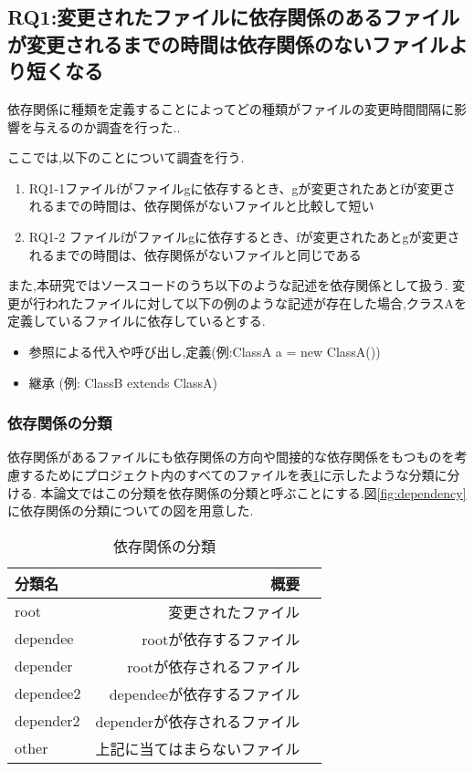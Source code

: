 \documentclass[submit,ses,noauthor]{ipsj} %
\begin{document}
\subsection{RQ1:変更されたファイルに依存関係のあるファイルが変更されるまでの時間は依存関係のないファイルより短くなる}
依存関係に種類を定義することによってどの種類がファイルの変更時間間隔に影響を与えるのか調査を行った..

ここでは,以下のことについて調査を行う.
\begin{enumerate}
\item RQ1-1ファイルfがファイルgに依存するとき、gが変更されたあとfが変更されるまでの時間は、依存関係がないファイルと比較して短い
\item RQ1-2 ファイルfがファイルgに依存するとき、fが変更されたあとgが変更されるまでの時間は、依存関係がないファイルと同じである
\end{enumerate}

また,本研究ではソースコードのうち以下のような記述を依存関係として扱う.
変更が行われたファイルに対して以下の例のような記述が存在した場合,クラスAを定義しているファイルに依存しているとする.

\begin{itemize}
\item 参照による代入や呼び出し,定義(例:ClassA a = new ClassA())
\item 継承 (例: ClassB extends ClassA)
\end{itemize}

\subsubsection{依存関係の分類}
依存関係があるファイルにも依存関係の方向や間接的な依存関係をもつものを考慮するためにプロジェクト内のすべてのファイルを表\ref{tab:依存関係の分類}に示したような分類に分ける.
本論文ではこの分類を依存関係の分類と呼ぶことにする.図\ref{fig:dependency}に依存関係の分類についての図を用意した.

\begin{table}
\caption{依存関係の分類}
\begin{tabular}{|l|r|r|} \hline
分類名 & 概要 \\ \hline
root & 変更されたファイル \\ \hline
dependee & rootが依存するファイル \\ \hline
depender & rootが依存されるファイル \\ \hline
dependee2 & dependeeが依存するファイル \\ \hline
depender2 & dependerが依存されるファイル \\ \hline
other & 上記に当てはまらないファイル \\ \hline
\end{tabular}
\label{tab:依存関係の分類}
\end{table}
\end{document}
